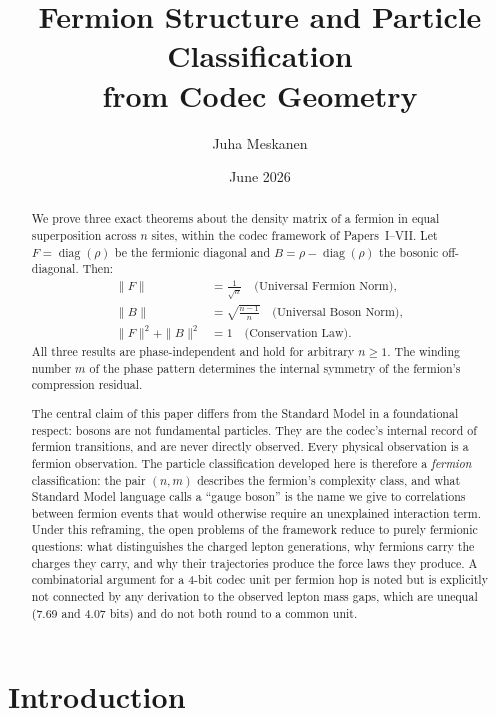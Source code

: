\documentclass[11pt]{article}
\title{Fermion Structure and Particle Classification\\
from Codec Geometry}
\author{Juha Meskanen}
\date{June 2026}
\begin{document}
\maketitle

\begin{abstract}
We prove three exact theorems about the density matrix of a fermion
in equal superposition across $n$ sites, within the codec framework
of Papers~I--VII.
Let $F = \operatorname{diag}(\rho)$ be the fermionic diagonal and
$B = \rho - \operatorname{diag}(\rho)$ the bosonic off-diagonal.
Then:
\begin{align*}
  \|F\| &= \frac{1}{\sqrt{n}} \quad \text{(Universal Fermion Norm)}, \\
  \|B\| &= \sqrt{\frac{n-1}{n}} \quad \text{(Universal Boson Norm)}, \\
  \|F\|^2 + \|B\|^2 &= 1 \quad \text{(Conservation Law)}.
\end{align*}
All three results are phase-independent and hold for arbitrary
$n \geq 1$.
The winding number $m$ of the phase pattern determines the internal
symmetry of the fermion's compression residual.

The central claim of this paper differs from the Standard Model in
a foundational respect: bosons are not fundamental particles.
They are the codec's internal record of fermion transitions, and
are never directly observed.
Every physical observation is a fermion observation.
The particle classification developed here is therefore a
\emph{fermion} classification: the pair $(n, m)$ describes the
fermion's complexity class, and what Standard Model language calls
a ``gauge boson'' is the name we give to correlations between
fermion events that would otherwise require an unexplained interaction
term.
Under this reframing, the open problems of the framework reduce
to purely fermionic questions: what distinguishes the charged lepton
generations, why fermions carry the charges they carry, and why
their trajectories produce the force laws they produce.
A combinatorial argument for a 4-bit codec unit per fermion hop is
noted but is explicitly not connected by any derivation to the
observed lepton mass gaps, which are unequal (7.69 and 4.07 bits)
and do not both round to a common unit.
\end{abstract}

\tableofcontents
\newpage

\section{Introduction}
\label{sec:intro}
\end{document}
